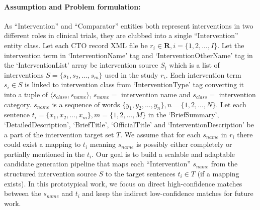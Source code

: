 \documentclass[letterpaper]{article} %
\begin{document}
\paragraph{Assumption and Problem formulation: }
As ``Intervention'' and ``Comparator'' entities both represent interventions in two different roles in clinical trials, they are clubbed into a single ``Intervention'' entity class.
Let each CTO record XML file be $r_i \in \boldsymbol{R}, i = \{ 1, 2, ... , I \}$.
Let the intervention term in `InterventionName' tag and `InterventionOtherName' tag in the `InterventionList' array be intervention source $S_i$ which is a list of interventions $S = \{ s_1, s_2, ... , s_m \}$ used in the study $r_i$.
Each intervention term $s_i \in S$ is linked to intervention class from `InterventionType' tag converting it into a tuple of $ \langle s_{class}, s_{name} \rangle$, $s_{name} =$ intervention name and $s_{class} =$ intervention category.
$s_{name}$ is a sequence of words $\{ y_1, y_2, ... , y_n \}, n = \{ 1, 2, ... , N \} $.
Let each sentence $t_i = \{ x_1, x_2, ... , x_m \}, m = \{ 1, 2, ... , M \}$ in the `BriefSummary', `DetailedDescription', `BriefTitle', `OfficialTitle' and `InterventionDescription' be a part of the intervention target set $T$.
We assume that for each $s_{name}$ in $r_i$ there could exist a mapping to $t_i$ meaning $s_{name}$ is possibly either completely or partially mentioned in the $t_i$.
Our goal is to build a scalable and adaptable candidate generation pipeline that maps each ``Intervention'' $s_{name}$ from the structured intervention source $S$ to the target sentences $t_i \in T$ (if a mapping exists).
In this prototypical work, we focus on direct high-confidence matches between the $s_{name}$ and $t_i$ and keep the indirect low-confidence matches for future work.
%
\end{document}
